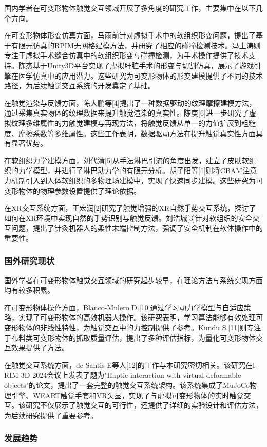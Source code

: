国内学者在可变形物体触觉交互领域开展了多角度的研究工作，主要集中在以下几个方向。

在可变形物体形变仿真方面，马雨前针对虚拟手术中的软组织形变问题，提出了基于有限元仿真的RPIM无网格建模方法，并研究了相应的碰撞检测技术。冯上涛则专注于虚拟手术缝合仿真中的软组织形变与碰撞检测，为手术操作提供了技术支持。陈杰基于Unity3D平台实现了虚拟肝脏手术的形变与切割仿真，展示了游戏引擎在医学仿真中的应用潜力。这些研究为可变形物体的形变建模提供了不同的技术路径，为后续触觉交互系统的开发奠定了基础。

在触觉渲染与反馈方面，陈大鹏等[4]提出了一种数据驱动的纹理摩擦建模方法，通过采集真实物体的纹理数据来提升触觉渲染的真实性。陈庚[6]进一步研究了虚拟纹理多维属性的力触觉建模与再现方法，将触觉反馈从单一的力值扩展到粗糙度、摩擦系数等多维属性。这些工作表明，数据驱动方法在提升触觉真实性方面具有显著优势。

在软组织力学建模方面，刘代清[5]从手法淋巴引流的角度出发，建立了皮肤软组织的力学模型，并进行了淋巴动力学的有限元分析。胡子阳等[1]则将CBAM注意力机制引入到人体软组织的多物理场建模中，实现了快速同步建模。这些研究为可变形物体的物理参数设置提供了理论依据。

在XR交互系统方面，王宏润[2]研究了触觉增强的XR自然手势交互系统，探讨了如何在XR环境中实现自然的手势识别与触觉反馈。刘浩城[3]针对软组织的安全交互问题，提出了针灸机器人的柔性末端控制方法，强调了安全机制在软体操作中的重要性。

\subsubsection{国外研究现状}

国外学者在可变形物体触觉交互领域的研究起步较早，在理论方法与系统实现方面均有较多积累。

在可变形物体操作方面，Blanco-Mulero D.[10]通过学习动力学模型与自适应策略，实现了可变形物体的高效机器人操作。该研究表明，学习算法能够有效处理可变形物体的非线性特性，为触觉交互中的力控制提供了参考。Kundu S.[11]则专注于布料类可变形物体的抓取质量评估，提出了多种评估指标，为量化可变形物体交互效果提供了方法。

在触觉交互系统方面，de Santis E等人[12]的工作与本研究密切相关。该研究在I-RIM 3D 2024会议上发表了题为"Haptic interaction with virtual deformable objects"的论文，提出了一套完整的触觉交互系统架构。该系统集成了MuJoCo物理引擎、WEART触觉手套和VR头显，实现了与虚拟可变形物体的实时触觉交互。该研究不仅展示了触觉交互的可行性，还提供了详细的实验设计和评估方法，为后续研究提供了重要参考。

\subsubsection{发展趋势}

